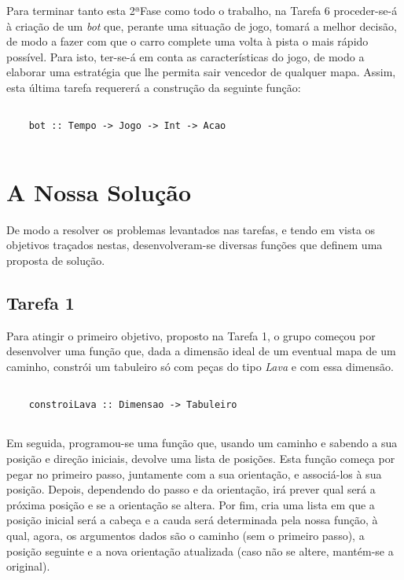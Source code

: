 \documentclass[a4paper]{report} %
\begin{document}
  \hspace{1cm}

  \par \noindent Para terminar tanto esta 2ªFase como todo o trabalho, na Tarefa 6 proceder-se-á à criação de um \textit{bot} que, perante uma situação de jogo, tomará a melhor decisão, de modo a fazer com que o carro complete uma volta à pista o mais rápido possível. Para isto, ter-se-á em conta as características do jogo, de modo a elaborar uma estratégia que lhe permita sair vencedor de qualquer mapa. Assim, esta última tarefa requererá a construção da seguinte função:

  \begin{verbatim}

    bot :: Tempo -> Jogo -> Int -> Acao
    
  \end{verbatim}





\chapter{A Nossa Solução}
\label{sec:solucao}

  \par \noindent De modo a resolver os problemas levantados nas tarefas, e tendo em vista os objetivos traçados nestas, desenvolveram-se diversas funções que definem uma proposta de solução.

  \section{Tarefa 1}

  \par \noindent Para atingir o primeiro objetivo, proposto na Tarefa 1, o grupo começou por desenvolver uma função que, dada a dimensão ideal de um eventual mapa de um caminho, constrói um tabuleiro só com peças do tipo \textit{Lava} e com essa dimensão. 

  \begin{verbatim}
    
    constroiLava :: Dimensao -> Tabuleiro
    
  \end{verbatim}

  \par \noindent Em seguida, programou-se uma função que, usando um caminho e sabendo a sua posição e direção iniciais, devolve uma lista de posições. Esta função começa por pegar no primeiro passo, juntamente com a sua orientação, e associá-los à sua posição. Depois, dependendo do passo e da orientação, irá prever qual será a próxima posição e se a orientação se altera. Por fim, cria uma lista em que a posição inicial será a cabeça e a cauda será determinada pela nossa função, à qual, agora, os argumentos dados são o caminho (sem o primeiro passo), a posição seguinte e a nova orientação atualizada (caso não se altere, mantém-se a original).
\end{document}
